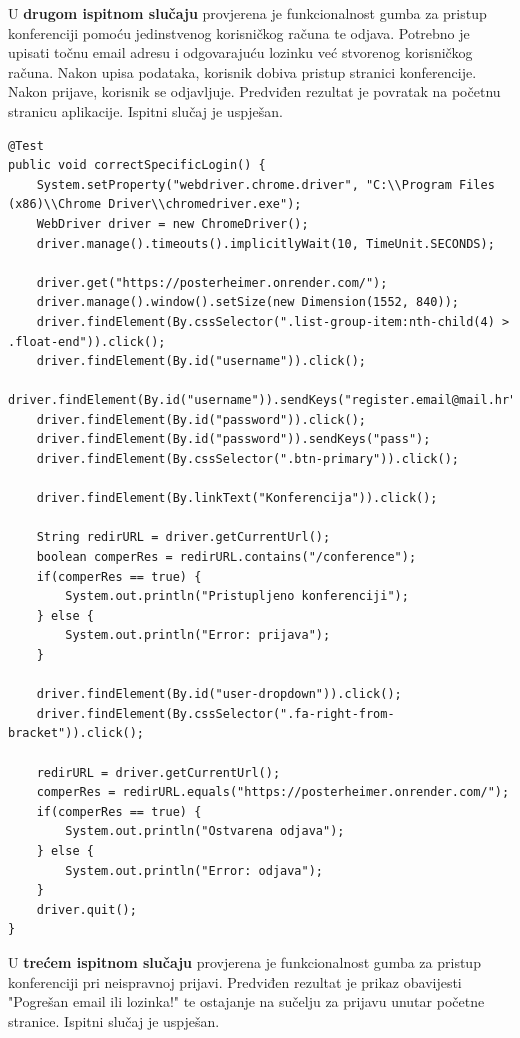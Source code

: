 			U \textbf{drugom ispitnom slučaju} provjerena je funkcionalnost gumba za pristup konferenciji pomoću jedinstvenog korisničkog računa te odjava. Potrebno je upisati točnu email adresu i odgovarajuću lozinku već stvorenog korisničkog računa. Nakon upisa podataka, korisnik dobiva pristup stranici konferencije. Nakon prijave, korisnik se odjavljuje. Predviđen rezultat je povratak na početnu stranicu aplikacije. Ispitni slučaj je uspješan.  

			
			\begin{lstlisting}
@Test
public void correctSpecificLogin() {
	System.setProperty("webdriver.chrome.driver", "C:\\Program Files (x86)\\Chrome Driver\\chromedriver.exe");
	WebDriver driver = new ChromeDriver();
	driver.manage().timeouts().implicitlyWait(10, TimeUnit.SECONDS);
	
	driver.get("https://posterheimer.onrender.com/");
	driver.manage().window().setSize(new Dimension(1552, 840));
	driver.findElement(By.cssSelector(".list-group-item:nth-child(4) > .float-end")).click();
	driver.findElement(By.id("username")).click();
	driver.findElement(By.id("username")).sendKeys("register.email@mail.hr");
	driver.findElement(By.id("password")).click();
	driver.findElement(By.id("password")).sendKeys("pass");
	driver.findElement(By.cssSelector(".btn-primary")).click();
	
	driver.findElement(By.linkText("Konferencija")).click();
	
	String redirURL = driver.getCurrentUrl();
	boolean comperRes = redirURL.contains("/conference");
	if(comperRes == true) {
		System.out.println("Pristupljeno konferenciji");
	} else {
		System.out.println("Error: prijava");
	}
	
	driver.findElement(By.id("user-dropdown")).click();
	driver.findElement(By.cssSelector(".fa-right-from-bracket")).click();
	
	redirURL = driver.getCurrentUrl();
	comperRes = redirURL.equals("https://posterheimer.onrender.com/");
	if(comperRes == true) {
		System.out.println("Ostvarena odjava");
	} else {
		System.out.println("Error: odjava");
	}
	driver.quit();
}	
			\end{lstlisting}
			
			
			U \textbf{trećem ispitnom slučaju} provjerena je funkcionalnost gumba za pristup konferenciji pri neispravnoj prijavi. Predviđen rezultat je prikaz obavijesti "Pogrešan email ili lozinka!" te ostajanje na sučelju za prijavu unutar početne stranice. Ispitni slučaj je uspješan.
			
